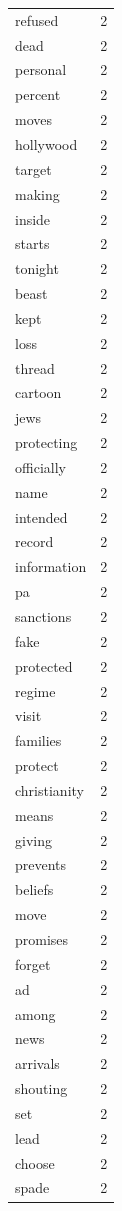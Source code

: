 \begin{tabular}{lr}
refused & 2 \\
dead & 2 \\
personal & 2 \\
percent & 2 \\
moves & 2 \\
hollywood & 2 \\
target & 2 \\
making & 2 \\
inside & 2 \\
starts & 2 \\
tonight & 2 \\
beast & 2 \\
kept & 2 \\
loss & 2 \\
thread & 2 \\
cartoon & 2 \\
jews & 2 \\
protecting & 2 \\
officially & 2 \\
name & 2 \\
intended & 2 \\
record & 2 \\
information & 2 \\
pa & 2 \\
sanctions & 2 \\
fake & 2 \\
protected & 2 \\
regime & 2 \\
visit & 2 \\
families & 2 \\
protect & 2 \\
christianity & 2 \\
means & 2 \\
giving & 2 \\
prevents & 2 \\
beliefs & 2 \\
move & 2 \\
promises & 2 \\
forget & 2 \\
ad & 2 \\
among & 2 \\
news & 2 \\
arrivals & 2 \\
shouting & 2 \\
set & 2 \\
lead & 2 \\
choose & 2 \\
spade & 2 \\

\end{tabular}
